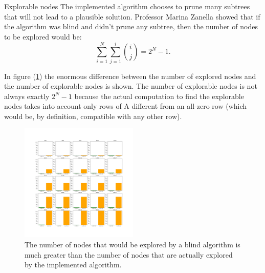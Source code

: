 \documentclass{beamer}
\begin{document}
\begin{frame}{Explorable nodes}
    The implemented algorithm chooses to prune many subtrees
    that will not lead to a plausible solution.
    Professor Marina Zanella showed that if the algorithm was blind and didn't prune any subtree,
    then the number of nodes to be explored would be:
    \begin{equation*}
        \sum_{i=1}^{N}\sum_{j=1}^{i}\binom{i}{j} = 2^N-1.
    \end{equation*}

    In figure (\ref{fig:explored_vs_explorable_5x5}) the enormous difference
    between the number of explored nodes and the number of explorable nodes is shown.
    The number of explorable nodes is not always exactly $2^N - 1$ because
    the actual computation to find the explorable nodes takes into 
    account only rows of A different from an all-zero row (which would be,
    by definition, compatible with any other row).
\end{frame}

\begin{frame}
    \begin{figure}
        \centering
        \includegraphics[width=0.5\textwidth]{explored_vs_explorable_5x5.pdf}
        \caption{The number of nodes that would be explored by a blind algorithm is
        much greater than the number of nodes that are actually explored by the implemented algorithm.}
        \label{fig:explored_vs_explorable_5x5}
    \end{figure}
\end{frame}
\end{document}
